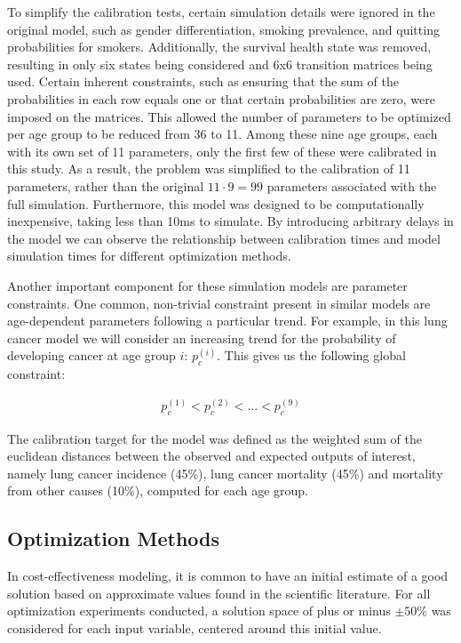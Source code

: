 \documentclass{IOS-Book-Article}
\begin{document}
	To simplify the calibration tests, certain simulation details were ignored in the original model, such as gender differentiation, smoking prevalence, and quitting probabilities for smokers. Additionally, the survival health state was removed, resulting in only six states being considered and 6x6 transition matrices being used. Certain inherent constraints, such as ensuring that the sum of the probabilities in each row equals one or that certain probabilities are zero, were imposed on the matrices. This allowed the number of parameters to be optimized per age group to be reduced from 36 to 11. Among these nine age groups, each with its own set of 11 parameters, only the first few of these were calibrated in this study. As a result, the problem was simplified to the calibration of 11 parameters, rather than the original $11\cdot 9=99$ parameters associated with the full simulation. Furthermore, this model was designed to be computationally inexpensive, taking less than 10ms to simulate. By introducing arbitrary delays in the model we can observe the relationship between calibration times and model simulation times for different optimization methods.
		
	Another important component for these simulation models are parameter constraints. One common, non-trivial constraint present in similar models are age-dependent parameters following a particular trend. For example, in this lung cancer model we will consider an increasing trend for the probability of developing cancer at age group $i$: $p_c^{(i)}$. This gives us the following global constraint:
	
	\begin{equation} \label{eq:constraint}
		\begin{aligned}
			p_c^{(1)} < p_c^{(2)} < \dots < p_c^{(9)}	
		\end{aligned}
	\end{equation}
		
	The calibration target for the model was defined as the weighted sum of the euclidean distances between the observed and expected outputs of interest, namely lung cancer incidence (45\%), lung cancer mortality (45\%) and mortality from other causes (10\%), computed for each age group.
	
	
	\subsection{Optimization Methods}
	In cost-effectiveness modeling, it is common to have an initial estimate of a good solution based on approximate values found in the scientific literature. For all optimization experiments conducted, a solution space of plus or minus $\pm 50\%$ was considered for each input variable, centered around this initial value.
	
\end{document}
